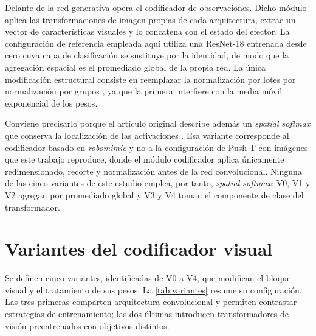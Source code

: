 Delante de la red generativa opera el codificador de observaciones. Dicho m\'odulo aplica
las transformaciones de imagen propias de cada arquitectura, extrae un vector de
caracter\'isticas visuales y lo concatena con el estado del efector. La configuraci\'on de
referencia empleada aqu\'i utiliza una ResNet-18 \cite{he2016resnet} entrenada desde cero
cuya capa de clasificaci\'on se sustituye por la identidad, de modo que la agregaci\'on
espacial es el promediado global de la propia red. La \'unica modificaci\'on estructural
consiste en reemplazar la normalizaci\'on por lotes por normalizaci\'on por grupos
\cite{wu2018groupnorm}, ya que la primera interfiere con la media m\'ovil exponencial de
los pesos.

Conviene precisarlo porque el art\'iculo original describe adem\'as un \textit{spatial
softmax} que conserva la localizaci\'on de las activaciones \cite{levine2016visuomotor}.
Esa variante corresponde al codificador basado en \textit{robomimic} y no a la
configuraci\'on de Push-T con im\'agenes que este trabajo reproduce, donde el m\'odulo
codificador aplica \'unicamente redimensionado, recorte y normalizaci\'on antes de la red
convolucional. Ninguna de las cinco variantes de este estudio emplea, por tanto,
\textit{spatial softmax}: V0, V1 y V2 agregan por promediado global y V3 y V4 toman el
componente de clase del transformador.

\section{Variantes del codificador visual}
\label{sec:variantes}

Se definen cinco variantes, identificadas de V0 a V4, que modifican el bloque visual y el
tratamiento de sus pesos. La \cref{tab:variantes} resume su configuraci\'on. Las tres
primeras comparten arquitectura convolucional y permiten contrastar estrategias de
entrenamiento; las dos \'ultimas introducen transformadores de visi\'on preentrenados con
objetivos distintos.

